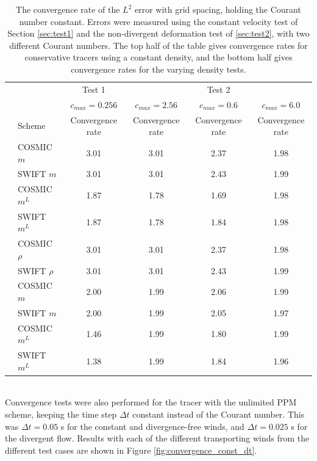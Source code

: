 \documentclass[11pt,a4paper]{article}
\begin{document}
\begin{table}[h!]
\small
\begin{center}
\begin{tabular}{| c | l | c  c | c c |} \hline
  &  & Test 1 & & Test 2 &  \\
  &  & $c_{max}=0.256$ & $c_{max}=2.56$ & $c_{max}=0.6$ & $c_{max}=6.0$ \\
  & Scheme &  Convergence rate & Convergence rate & Convergence rate & Convergence rate   \\ \hline
  \parbox[t]{2mm}{}
  & COSMIC $m$ & 3.01 & 3.01 & 2.37 & 1.98 \\
  & SWIFT $m$ & 3.01 & 3.01 & 2.43 & 1.99 \\
  & COSMIC $m^L$ & 1.87 & 1.78 & 1.69 & 1.98 \\
  & SWIFT  $m^L$ & 1.87 & 1.78 & 1.84 & 1.98 \\ \hline
  \parbox[t]{2mm}{}
  & COSMIC $\rho$ & 3.01 & 3.01 & 2.37 & 1.98 \\
  & SWIFT $\rho$ & 3.01 & 3.01 & 2.43 & 1.99 \\
  & COSMIC $m$ & 2.00 & 1.99 & 2.06 & 1.99 \\
  & SWIFT $m$ & 2.00 & 1.99 & 2.05 & 1.97\\
  & COSMIC $m^L$ & 1.46 & 1.99 & 1.80 & 1.99 \\
  & SWIFT $m^L$ & 1.38 & 1.99 & 1.84 & 1.96 \\ \hline
\end{tabular}
\caption{The convergence rate of the $L^2$ error with grid spacing, holding the Courant number constant. Errors were measured using the constant velocity test of Section \ref{sec:test1} and the non-divergent deformation test of \ref{sec:test2}, with two different Courant numbers.
The top half of the table gives convergence rates for conservative tracers using a constant density, and the bottom half gives convergence rates for the varying density tests.}
\label{table:convergence_const_c}
\end{center}
\end{table}
\\
Convergence tests were also performed for the tracer with the unlimited PPM scheme, keeping the time step $\Delta t$ constant instead of the Courant number.
This was $\Delta t=0.05$ s for the constant and divergence-free winds, and $\Delta t=0.025$ s for the divergent flow.
Results with each of the different transporting winds from the different test cases are shown in Figure \ref{fig:convergence_const_dt}.
\end{document}
